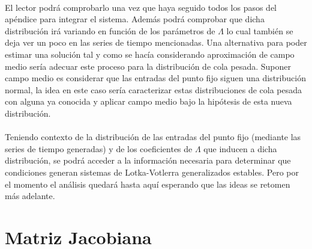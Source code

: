 \\
El lector podrá comprobarlo una vez que haya seguido todos los pasos del apéndice para integrar el sistema. Además podrá comprobar que dicha distribución irá variando en función de los parámetros de $\Lambda$ lo cual también se deja ver un poco en las series de tiempo mencionadas. Una alternativa para poder estimar una solución tal y como se hacía considerando aproximación de campo medio sería adecuar este proceso para la distribución de cola pesada. Suponer campo medio es considerar que las entradas del punto fijo siguen una distribución normal, la idea en este caso sería caracterizar estas distribuciones de cola pesada con alguna ya conocida y aplicar campo medio bajo la hipótesis de esta nueva distribución.\\
\\
Teniendo contexto de la distribución de las entradas del punto fijo (mediante las series de tiempo generadas) y de los coeficientes de $\Lambda$ que inducen a dicha distribución, se podrá acceder a la información necesaria para determinar que condiciones generan sistemas de Lotka-Votlerra generalizados estables. Pero por el momento el análisis quedará hasta aquí esperando que las ideas se retomen más adelante.

\section{Matriz Jacobiana}


